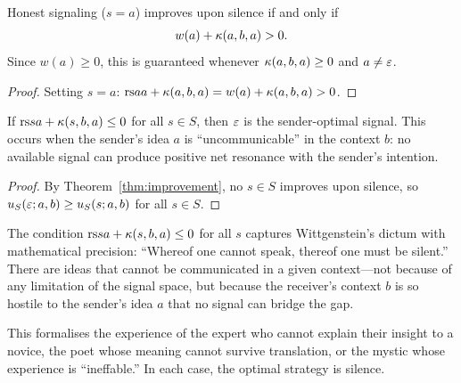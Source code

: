 \begin{corollary}
\label{cor:honest-improvement}
Honest signaling ($s = a$) improves upon silence if and only if
\[
  w(a) + \kappa(a, b, a) > 0.
\]
Since $w(a) \geq 0$, this is guaranteed whenever $\kappa(a, b, a) \geq 0$
and $a \neq \varepsilon$.
\end{corollary}

\begin{proof}
Setting $s = a$: $\mathrm{rs}{a}{a} + \kappa(a, b, a) = w(a) + \kappa(a, b, a) > 0$.
\end{proof}

\begin{proposition}
\label{prop:silence-optimal}
If $\mathrm{rs}{s}{a} + \kappa(s, b, a) \leq 0$ for all $s \in S$, then $\varepsilon$
is the sender-optimal signal.  This occurs when the sender's idea $a$ is
``uncommunicable'' in the context $b$: no available signal can produce
positive net resonance with the sender's intention.
\end{proposition}

\begin{proof}
By Theorem~\ref{thm:improvement}, no $s \in S$ improves upon silence, so
$u_S(\varepsilon; a, b) \geq u_S(s; a, b)$ for all $s \in S$.
\end{proof}

\begin{interpretation}
The condition $\mathrm{rs}{s}{a} + \kappa(s, b, a) \leq 0$ for all $s$ captures
Wittgenstein's dictum with mathematical precision: ``Whereof one cannot speak,
thereof one must be silent.''  There are ideas that cannot be communicated
in a given context---not because of any limitation of the signal space, but
because the receiver's context $b$ is so hostile to the sender's idea $a$
that no signal can bridge the gap.

This formalises the experience of the expert who cannot explain their
insight to a novice, the poet whose meaning cannot survive translation,
or the mystic whose experience is ``ineffable.''  In each case, the optimal
strategy is silence.
\end{interpretation}

